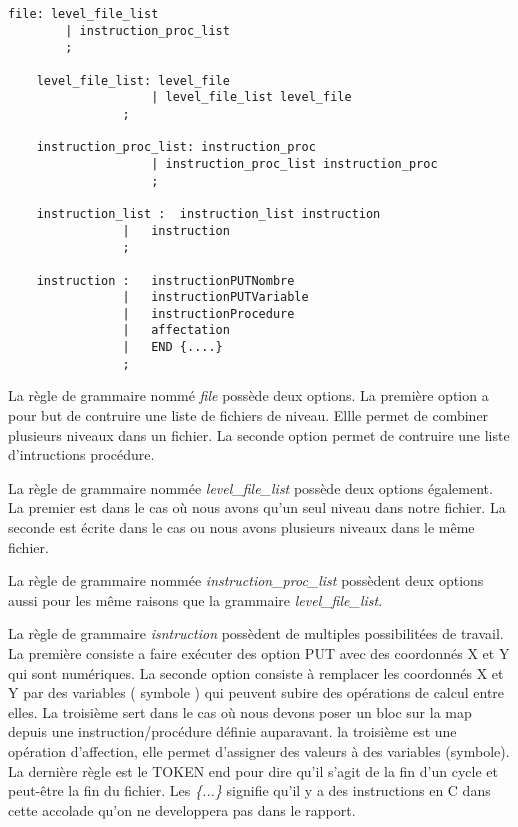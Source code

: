 \lstset{style=mystyle}
\begin{lstlisting}[caption=Régle généraliste pour la bonne lecture d'un fichier]
file: level_file_list
        | instruction_proc_list
        ;

    level_file_list: level_file
                    | level_file_list level_file
                ;

    instruction_proc_list: instruction_proc
                    | instruction_proc_list instruction_proc
                    ;

    instruction_list :  instruction_list instruction
                |   instruction
                ;

    instruction :   instructionPUTNombre
                |   instructionPUTVariable
                |   instructionProcedure
                |   affectation
                |   END {....}
                ;
\end{lstlisting}

La règle de grammaire nommé \textit{file} possède deux options. La première option a pour but de contruire une liste de fichiers de niveau.  Ellle permet de combiner plusieurs niveaux dans un fichier. La seconde option permet de contruire une liste d'intructions procédure.

La règle de grammaire nommée \textit{level\_file\_list} possède deux options également. La premier est dans le cas où nous avons qu'un seul niveau dans notre fichier. La seconde est écrite dans le cas ou nous avons plusieurs niveaux dans le même fichier.

La règle de grammaire nommée \textit{instruction\_proc\_list} possèdent deux options aussi pour les même raisons que la grammaire \textit{level\_file\_list}.

La règle de grammaire \textit{isntruction} possèdent de multiples possibilitées de travail. La première consiste a faire exécuter des option PUT avec des coordonnés X et Y qui sont numériques. La seconde option consiste à remplacer les coordonnés X et Y par des variables ( symbole ) qui peuvent subire des opérations de calcul entre elles. La troisième sert dans le cas où nous devons poser un bloc sur la map depuis une instruction/procédure définie auparavant. la troisième est une opération d'affection, elle permet d'assigner des valeurs à des variables (symbole). La dernière règle est le TOKEN end pour dire qu'il s'agit de la fin d'un cycle et peut-être la fin du fichier. Les \textit{\{...\}} signifie qu'il y a des instructions en C dans cette accolade qu'on ne developpera pas dans le rapport.
\newpage

